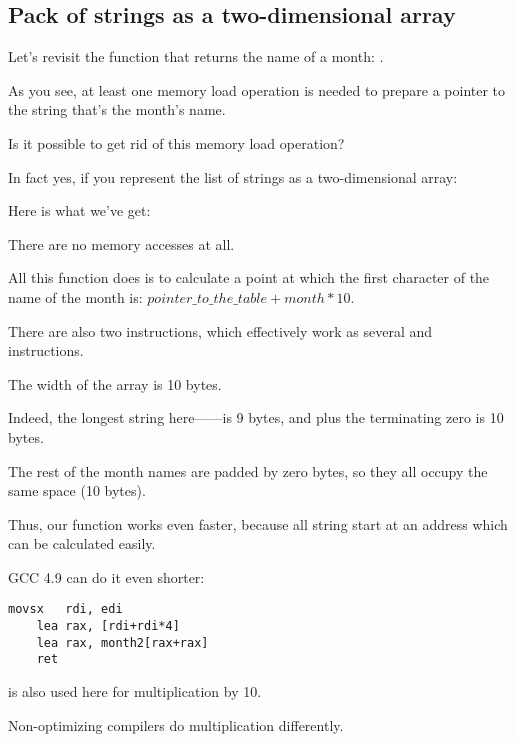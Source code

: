 \subsection{Pack of strings as a two-dimensional array}

Let's revisit the function that returns the name of a month: .

As you see, at least one memory load operation is needed to prepare a pointer to the string
that's the month's name.

Is it possible to get rid of this memory load operation?

In fact yes, if you represent the list of strings as a two-dimensional array:



Here is what we've get:



There are no memory accesses at all.

All this function does is to calculate a point at which the first character of the name of the month is: 
$pointer\_to\_the\_table + month * 10$.

There are also two \LEA instructions, which effectively work as several \MUL and \MOV instructions.

The width of the array is 10 bytes. 

Indeed, the longest string here------is 9 bytes, and plus the terminating zero is 10 bytes.

The rest of the month names are padded by zero bytes, so they all occupy the same space (10 bytes).

Thus, our function works even faster, because all string start at an address which can be
calculated easily.

\Optimizing GCC 4.9 can do it even shorter:

\begin{lstlisting}[caption=\Optimizing GCC 4.9 x64]
	movsx	rdi, edi
	lea	rax, [rdi+rdi*4]
	lea	rax, month2[rax+rax]
	ret
\end{lstlisting}

\LEA is also used here for multiplication by 10.

Non-optimizing compilers do multiplication differently.



